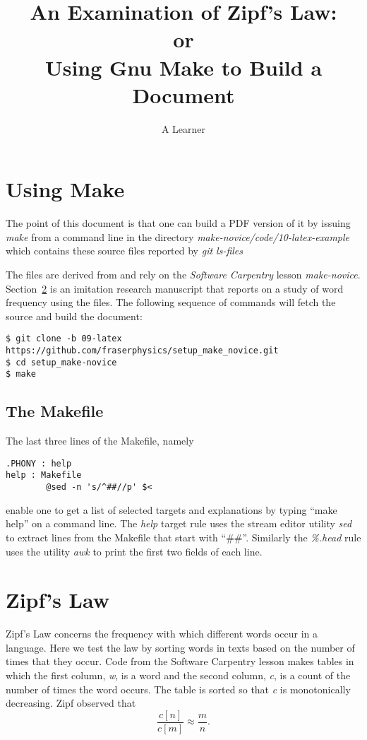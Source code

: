 \documentclass[]{article}
\title{An Examination of Zipf's Law:\\ or\\ Using Gnu Make to Build a
  Document}
\author{A Learner}
\begin{document}
\maketitle

\section{Using Make}
\label{sec:make}

The point of this document is that one can build a PDF version of it
by issuing \emph{make} from a command line in the directory
\emph{make-novice/code/10-latex-example} which contains these
source files reported by \emph{git ls-files}
%

%
The files are derived from and rely on the \emph{Software
  Carpentry}\cite{software-carpentry} lesson \emph{make-novice}.
Section~\ref{sec:zipf} is an imitation research manuscript that
reports on a study of word frequency using the files.  The following
sequence of commands will fetch the source and build the document:
\begin{verbatim}
$ git clone -b 09-latex https://github.com/fraserphysics/setup_make_novice.git
$ cd setup_make-novice
$ make
\end{verbatim}

\subsection{The Makefile}
\label{sec:makefile}

The last three lines of the Makefile, namely
\begin{verbatim}
.PHONY : help
help : Makefile
        @sed -n 's/^##//p' $<
\end{verbatim}
enable one to get a list of selected targets and explanations by
typing ``make help'' on a command line.  The \emph{help} target rule
uses the stream editor utility \emph{sed} to extract lines from the
Makefile that start with ``\#\#''.  Similarly the \emph{\%.head} rule
uses the utility \emph{awk} to print the first two fields of each
line.

\section{Zipf's Law}
\label{sec:zipf}

Zipf's Law\cite{Zipf} concerns the frequency with which different
words occur in a language.  Here we test the law by sorting words in
texts based on the number of times that they occur.  Code from the
Software Carpentry lesson makes tables in which the first column,
\emph{w}, is a word and the second column, \emph{c}, is a count of the
number of times the word occurs.  The table is sorted so that \emph{c}
is monotonically decreasing.  Zipf observed that
\begin{equation}
  \frac{c[n]}{c[m]} \approx \frac{m}{n}.
\end{equation}
\end{document}
